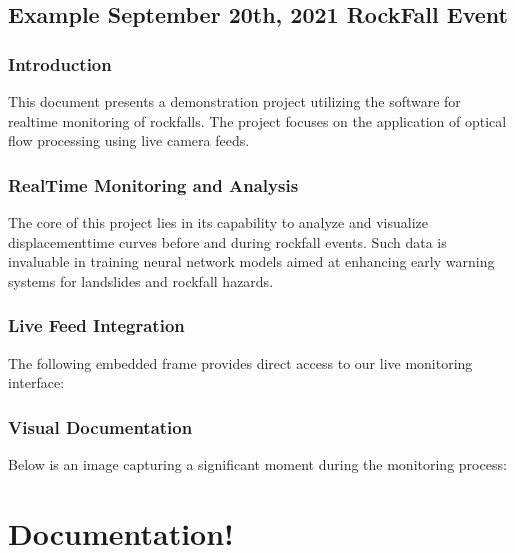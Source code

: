 \documentclass[letterpaper,10pt,english]{sphinxmanual}
\let\sphinxpxdimen\pdfpxdimen\else\newdimen\sphinxpxdimen
\begin{document}
\section{Example September 20th, 2021 RockFall Event}
\label{\detokenize{Stawamus_Chief:example-september-20th-2021-rockfall-event}}

\subsection{Introduction}
\label{\detokenize{Stawamus_Chief:introduction}}
\sphinxAtStartPar
This document presents a demonstration project utilizing the  software for real\sphinxhyphen{}time monitoring of rockfalls. The project focuses on the application of optical flow processing using live camera feeds.


\subsection{Real\sphinxhyphen{}Time Monitoring and Analysis}
\label{\detokenize{Stawamus_Chief:real-time-monitoring-and-analysis}}
\sphinxAtStartPar
The core of this project lies in its capability to analyze and visualize displacement\sphinxhyphen{}time curves before and during rockfall events. Such data is invaluable in training neural network models aimed at enhancing early warning systems for landslides and rockfall hazards.


\subsection{Live Feed Integration}
\label{\detokenize{Stawamus_Chief:live-feed-integration}}
\sphinxAtStartPar
The following embedded frame provides direct access to our live monitoring interface:




\subsection{Visual Documentation}
\label{\detokenize{Stawamus_Chief:visual-documentation}}
\sphinxAtStartPar
Below is an image capturing a significant moment during the monitoring process:

\sphinxAtStartPar
\sphinxincludegraphics[width=1000\sphinxpxdimen,height=882\sphinxpxdimen]{{shot_squamish}.png}


\chapter{Documentation!}
\label{\detokenize{index:documentation}}
\sphinxstepscope
\end{document}
